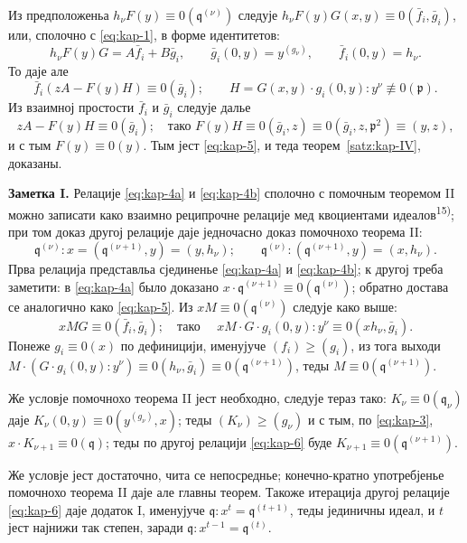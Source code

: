 \documentclass[11pt]{article}
\theoremstyle{plain}
\begin{document}
Из предположеньа $h_{\nu}F(y) \equiv 0(\mathfrak{q}^{(\nu)})$
следује
$h_{\nu}F(y)G(x,y) \equiv 0(\bar{f}_{i}, \bar{g}_{i})$, или, сполочно
с \eqref{eq:kap-1}, в форме идентитетов:
\[
h_{\nu}F(y)G = A\bar{f}_{i} + B\bar{g}_{i}, \qquad
\bar{g}_{i}(0,y) = y^{(g_{\nu})}, \qquad
\bar{f}_{i}(0,y) = h_{\nu}.
\]
То даје але
\[
\bar{f}_{i}(zA - F(y)H) \equiv 0(\bar{g}_{i}); \qquad
H = G(x,y) \cdot g_{i}(0,y) : y^{\nu} \not\equiv 0(\mathfrak{p}).
\]
Из взаимној простости $\bar{f}_{i}$ и $\bar{g}_{i}$ следује далье
\[
zA - F(y)H \equiv 0(\bar{g}_{i}); \quad \text{тако } F(y)H \equiv 0(\bar{g}_{i}, z)
\equiv 0(\bar{g}_{i}, z, \mathfrak{p}^{2}) \equiv (y, z),
\]
и с тым $F(y) \equiv 0(y)$. Тым јест \eqref{eq:kap-5}, и теда
теорем~\ref{satz:kap-IV}, доказаны.

\smallskip
\textbf{Заметка I.} Релације \eqref{eq:kap-4a} и
\eqref{eq:kap-4b} сполочно с помочным теоремом II можно записати
како взаимно реципрочне релације мед квоциентами идеалов\textsuperscript{15)};
при том доказ другој релације даје једночасно доказ помочнохо
теорема II:
\begin{equation}\label{eq:kap-6}
\mathfrak{q}^{(\nu)} : x = (\mathfrak{q}^{(\nu+1)}, y) = (y, h_{\nu}); \qquad
\mathfrak{q}^{(\nu)} : (\mathfrak{q}^{(\nu+1)}, y) = (x, h_{\nu}).
\end{equation}
Прва релација представльа сјединенье \eqref{eq:kap-4a} и
\eqref{eq:kap-4b}; к другој треба заметити: в \eqref{eq:kap-4a}
было доказано
$x \cdot \mathfrak{q}^{(\nu+1)} \equiv 0(\mathfrak{q}^{(\nu)})$;
обратно достава се аналогично како \eqref{eq:kap-5}. Из
$xM \equiv 0(\mathfrak{q}^{(\nu)})$ следује како выше:
\[
xMG \equiv 0(\bar{f}_{i}, \bar{g}_{i}); \quad \text{тако }\quad
xM \cdot G \cdot g_{i}(0,y) : y^{\nu} \equiv 0(xh_{\nu}, \bar{g}_{i}).
\]
Понеже $g_{i} \equiv 0(x)$ по дефиницији, именујуче
$(f_{i}) \geq (g_{i})$, из тога выходи
$M \cdot (G \cdot g_{i}(0,y) : y^{\nu}) \equiv 0(h_{\nu}, \bar{g}_{i})
\equiv 0(\mathfrak{q}^{(\nu+1)})$, теды
$M \equiv 0(\mathfrak{q}^{(\nu+1)})$.

Же условје помочнохо теорема II јест необходно, следује тераз тако:
$K_{\nu} \equiv 0(\mathfrak{q}_{\nu})$ даје
$K_{\nu}(0,y) \equiv 0(y^{(g_{\nu})}, x)$; теды
$(K_{\nu}) \geq (g_{\nu})$ и с тым, по \eqref{eq:kap-3},
$x \cdot K_{\nu+1} \equiv 0(\mathfrak{q})$; теды по другој релацији
\eqref{eq:kap-6} буде
$K_{\nu+1} \equiv 0(\mathfrak{q}^{(\nu+1)})$.

Же условје јест достаточно, чита се непосреднье; конечно-кратно
употребјенье помочнохо теорема II даје але главны теорем. Такоже
итерација другој релације \eqref{eq:kap-6} даје додаток I, именујуче
$\mathfrak{q} : x^{t} = \mathfrak{q}^{(t+1)}$, теды јединичны
идеал, и $t$ јест најнижи так степен, заради
$\mathfrak{q} : x^{t-1} = \mathfrak{q}^{(t)}$.
\end{document}
